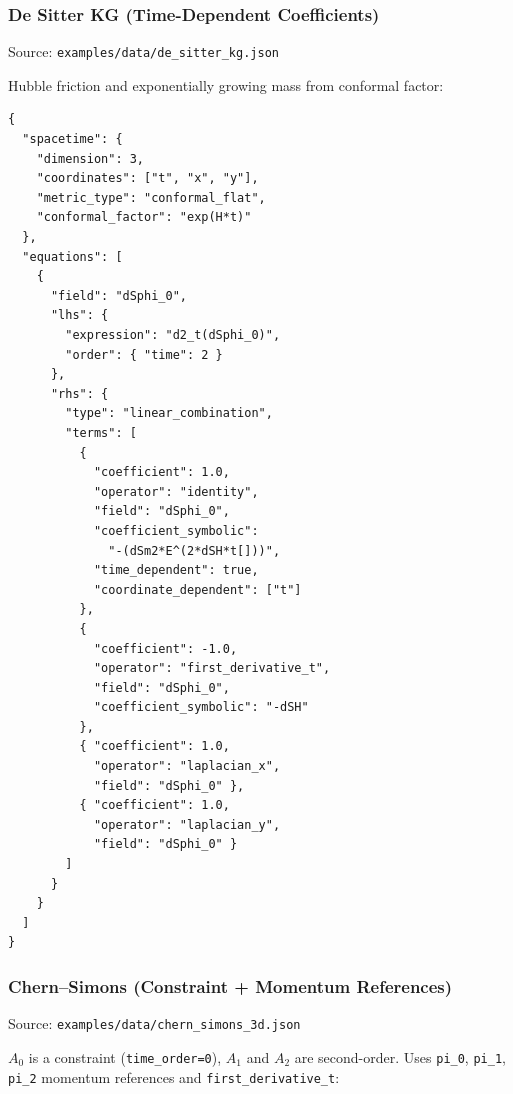 \subsubsection{De Sitter KG (Time-Dependent Coefficients)}
\label{sec:json-example-desitter}

Source: \texttt{examples/data/de\_sitter\_kg.json}

Hubble friction and exponentially growing mass from conformal factor:

\begin{lstlisting}[style=json]
{
  "spacetime": {
    "dimension": 3,
    "coordinates": ["t", "x", "y"],
    "metric_type": "conformal_flat",
    "conformal_factor": "exp(H*t)"
  },
  "equations": [
    {
      "field": "dSphi_0",
      "lhs": {
        "expression": "d2_t(dSphi_0)",
        "order": { "time": 2 }
      },
      "rhs": {
        "type": "linear_combination",
        "terms": [
          {
            "coefficient": 1.0,
            "operator": "identity",
            "field": "dSphi_0",
            "coefficient_symbolic":
              "-(dSm2*E^(2*dSH*t[]))",
            "time_dependent": true,
            "coordinate_dependent": ["t"]
          },
          {
            "coefficient": -1.0,
            "operator": "first_derivative_t",
            "field": "dSphi_0",
            "coefficient_symbolic": "-dSH"
          },
          { "coefficient": 1.0,
            "operator": "laplacian_x",
            "field": "dSphi_0" },
          { "coefficient": 1.0,
            "operator": "laplacian_y",
            "field": "dSphi_0" }
        ]
      }
    }
  ]
}
\end{lstlisting}

\subsubsection{Chern--Simons (Constraint + Momentum References)}
\label{sec:json-example-cs}

Source: \texttt{examples/data/chern\_simons\_3d.json}

$A_0$ is a constraint (\texttt{time\_order=0}), $A_1$ and $A_2$ are second-order. Uses \texttt{pi\_0}, \texttt{pi\_1}, \texttt{pi\_2} momentum references and \texttt{first\_derivative\_t}:

